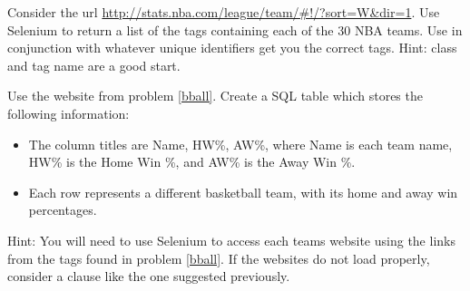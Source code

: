 \begin{problem}\label{bball}
Consider the url \url{http://stats.nba.com/league/team/#!/?sort=W&dir=1}.
Use Selenium to return a list of the  tags containing each of the 30 NBA teams.
Use  in conjunction with whatever unique identifiers get you the correct tags.
Hint: class and tag name are a good start.
\end{problem}

\begin{problem}
Use the website from problem \ref{bball}.
Create a SQL table which stores the following information:
\begin{itemize}
\item The column titles are Name, HW\%, AW\%, where Name is each team name, HW\% is the Home Win \%, and AW\% is the Away Win \%.
\item Each row represents a different basketball team, with its home and away win percentages.
\end{itemize}
Hint: You will need to use Selenium to access each teams website using the links from the tags found in problem \ref{bball}.
If the websites do not load properly, consider a  clause like the one suggested previously.
\end{problem}
